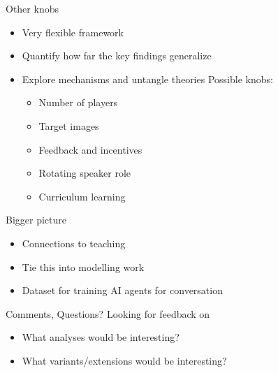 \documentclass[12pt, xcolor=beamer,table,usenames,dvipsnames, ignorenonframetext, ngerman,t]{beamer}
\begin{document}
\begin{frame}{Other knobs}
	\begin{itemize}
	\item Very flexible framework \pause
	\item Quantify how far the key findings generalize \pause
	\item Explore mechanisms and untangle theories \pause
	\itmem Possible knobs:\pause
\begin{itemize}
	\item Number of players \pause
	\item Target images \pause
	\item Feedback and incentives \pause
	\item Rotating speaker role \pause
	\item Curriculum learning
\end{itemize}
\end{itemize}
\end{frame}


\begin{frame}{Bigger picture}
	\begin{itemize}
		\item Connections to teaching \pause
		\item Tie this into modelling work \pause
		\item Dataset for training AI agents for conversation
	\end{itemize}
\end{frame}

\begin{frame}{Comments, Questions?}
	Looking for feedback on
	\smallskip
	\begin{itemize}
	\item What analyses would be interesting?
	\item What variants/extensions would be interesting?
	\end{itemize}
\end{frame}
\end{document}
